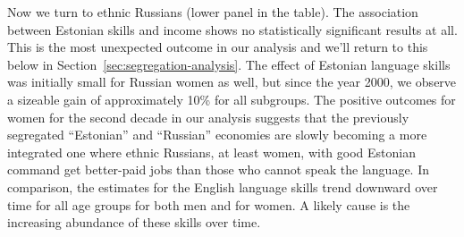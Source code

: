 \documentclass[12pt, a4paper]{article}
\begin{document}
Now we turn to ethnic Russians (lower panel in the table). The association between Estonian skills and income shows no
statistically significant results at all. This is the most unexpected
outcome in our analysis and we'll return to this
below in Section~\ref{sec:segregation-analysis}.
The effect of Estonian language skills was initially small for Russian
women as well, but
since the year 2000, we observe a sizeable gain of approximately
10\% for all subgroups.
The positive outcomes for women for the second decade in our analysis
suggests that the previously segregated ``Estonian'' and ``Russian''
economies are slowly becoming a more integrated one where ethnic
Russians, at least women, with good Estonian command get better-paid
jobs than those who cannot speak the language.
In comparison, the estimates for the English language skills trend downward over
time for all age groups for both men and for women. A likely
cause is the increasing abundance of these skills over time.
\end{document}

